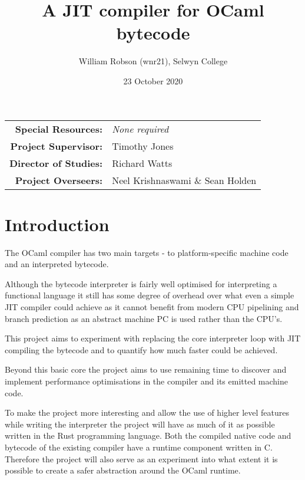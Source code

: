 \documentclass[12pt,a4paper, headings=standardclasses]{scrartcl}
\begin{document}
\title{A JIT compiler for OCaml bytecode}
\author{William Robson (wnr21), Selwyn College}
\date{23 October 2020}

\maketitle

\begin{center}
    \begin{tabular}{rl}
        \textbf{Special Resources:}   & \textit{None required}           \\
        \textbf{Project Supervisor:}  & Timothy Jones                    \\
        \textbf{Director of Studies:} & Richard Watts                    \\
        \textbf{Project Overseers:}   & Neel Krishnaswami \& Sean Holden \\
    \end{tabular}
\end{center}

\vspace{2cm}

\section*{Introduction}

The OCaml compiler has two main targets - to platform-specific machine code
and an interpreted bytecode.

Although the bytecode interpreter is fairly well optimised for interpreting a
functional language it still has some degree of overhead over what even a
simple JIT compiler could achieve as it cannot benefit from modern CPU
pipelining and branch prediction as an abstract machine PC is used rather than
the CPU's.

This project aims to experiment with replacing the core interpreter loop with
JIT compiling the bytecode and to quantify how much faster could be achieved.

Beyond this basic core the project aims to use remaining time to discover and
implement performance optimisations in the compiler and its emitted machine
code.

To make the project more interesting and allow the use of higher level
features while writing the interpreter the project will have as much of it as
possible written in the Rust programming language. Both the compiled native
code and bytecode of the existing compiler have a runtime component written
in C. Therefore the project will also serve as an experiment into what extent
it is possible to create a safer abstraction around the OCaml runtime.
\end{document}
